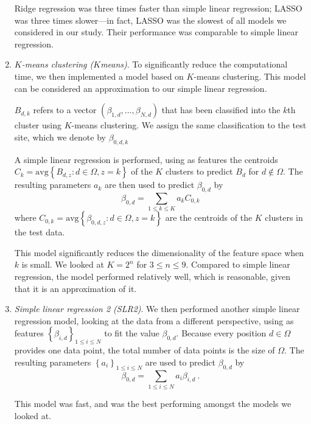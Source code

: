 \documentclass{article} %
\begin{document}
\begin{enumerate}
Ridge regression was three times faster than simple linear regression; LASSO was three times slower---in fact, LASSO was the slowest of all models we considered in our study. Their performance was comparable to simple linear regression.

\item \emph{$K$-means clustering ($K$means)}. To significantly reduce the computational time, we then implemented a model based on $K$-means clustering. This model can be considered an approximation to our simple linear regression.

$B_{d,k}$ refers to a vector $ \left(\beta_{1,d},\dots,\beta_{N,d}\right)$ that has been classified into the $k$th cluster using $K$-means clustering. We assign the same classification to the test site, which we denote by $\beta_{0,d,k}$

A simple linear regression is performed, using as features the centroids $C_k = \text{avg}\left\{B_{d,z} : d \in \Omega, z = k\right\}$ of the $K$ clusters to predict $B_{d}$ for $d \notin \Omega$. The resulting parameters $a_k$ are then used to predict $\beta_{0,d}$ by
\[ \beta_{0,d} = \sum_{1 \leq k \leq K} a_k C_{0,k}\]
where $C_{0,k} = \text{avg}\left\{\beta_{0,d,z} : d \in \Omega, z = k\right\}$ are the centroids of the $K$ clusters in the test data.

This model significantly reduces the dimensionality of the feature space when $k$ is small. We looked at $K = 2^n$ for $3 \leq n \leq 9$. Compared to simple linear regression, the model performed relatively well, which is reasonable, given that it is an approximation of it.

\item \emph{Simple linear regression 2 (SLR2)}. We then performed another simple linear regression model, looking at the data from a different perspective, using as features $\left\{ \beta_{i,d} \right\}_{1\leq i \leq N}$ to fit the value $\beta_{0,d}$. Because every position $d \in \Omega$ provides one data point, the total number of data points is the size of $\Omega$. The resulting parameters $\left\{ a_{i}\right\}_{1\leq i \leq N}$ are used to predict $\beta_{0,d}$ by
\begin{equation} \label{beta.samples} \beta_{0,d} = \sum_{1 \leq i \leq N} a_i \beta_{i,d} \ .\end{equation}

This model was fast, and was the best performing amongst the models we looked at.

\end{enumerate}
\end{document}
